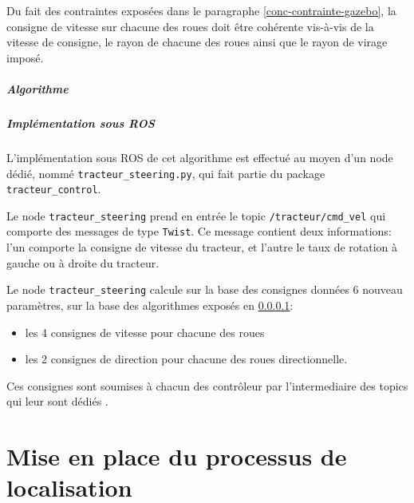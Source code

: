 \documentclass[12pt,a4paper]{report}
\begin{document}
		
		
			Du fait des contraintes exposées dans le paragraphe \ref{conc-contrainte-gazebo}, la consigne de vitesse sur chacune des roues doit être cohérente vis-à-vis de la vitesse de consigne, le rayon de chacune des roues ainsi que le rayon de virage imposé.
			
			\paragraph{Algorithme}
			\label{algo-steering}
			
			
			\paragraph{Implémentation sous ROS}
			
			L'implémentation sous ROS de cet algorithme est effectué au moyen d'un node dédié, nommé \verb|tracteur_steering.py|, qui fait partie du package \verb|tracteur_control|.
			
			\para Le node \verb|tracteur_steering| prend en entrée le topic \verb|/tracteur/cmd_vel| qui comporte des messages de type \verb|Twist|. Ce message contient deux informations: l'un comporte la consigne de vitesse du tracteur, et l'autre le taux de rotation à gauche ou à droite du tracteur.
			
			\para Le node \verb|tracteur_steering| calcule sur la base des consignes données 6 nouveau paramètres, sur la base des algorithmes exposés en \ref{algo-steering}:
			\begin{itemize}
				\item les 4 consignes de vitesse pour chacune des roues
				\item les 2 consignes de direction pour chacune des roues directionnelle.
			\end{itemize}
		
			\para Ces consignes sont soumises à chacun des contrôleur par l'intermediaire des topics qui leur sont dédiés .
			
			
			
			
		
		

\chapter{Mise en place du processus de localisation}
\end{document}
